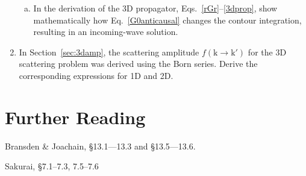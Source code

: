 \documentclass[prx,12pt]{revtex4-2}
\begin{document}
\begin{enumerate}
\begin{enumerate}[(a)]
\item  In the derivation of the 3D propagator,
  Eqs.~\eqref{rGr}--\eqref{3dprop}, show mathematically how
  Eq.~\eqref{G0anticausal} changes the contour integration, resulting
  in an incoming-wave solution.
  \end{enumerate}

\item In Section~\ref{sec:3damp}, the scattering amplitude
  $f(\mathrm{k}\rightarrow\mathrm{k}')$ for the 3D scattering problem
  was derived using the Born series.  Derive the corresponding
  expressions for 1D and 2D.
\end{enumerate}

\section*{Further Reading}

\begin{enumerate}[[1{]}]
\item Bransden \& Joachain, \S13.1---13.3 and \S13.5---13.6.
\item Sakurai, \S7.1--7.3, 7.5--7.6
\end{enumerate}
\end{document}
